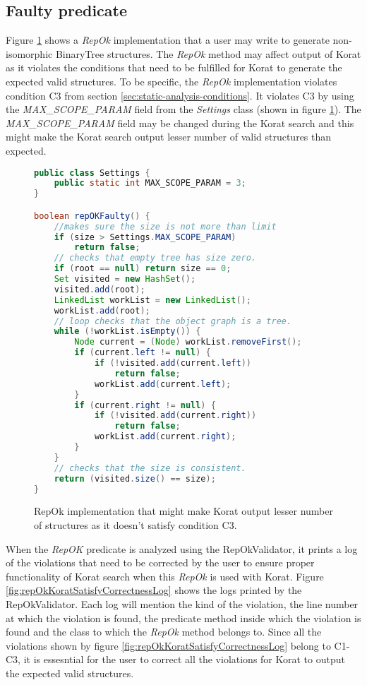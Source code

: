 \subsection{Faulty predicate}
\label{sec:faulty-predicate}
Figure \ref{fig:repOkKoratSatisfyCorrectness} shows a \emph{RepOk}
implementation that a user may write to generate non-isomorphic
BinaryTree structures. The \emph{RepOk} method may affect output of
Korat as it violates the conditions that need to be fulfilled for
Korat to generate the expected valid structures. To be specific, the
\emph{RepOk} implementation violates condition C3 from section
\ref{sec:static-analysis-conditions}. It violates C3 by using the
\emph{MAX\_SCOPE\_PARAM} field from the \emph{Settings} class (shown
in figure \ref{fig:repOkKoratSatisfyCorrectness}). The
\emph{MAX\_SCOPE\_PARAM} field may be changed during the Korat search
and this might make the Korat search output lesser number of valid
structures than expected.

\begin{figure}
\centering
\begin{lstlisting}[language=Java]
public class Settings {
    public static int MAX_SCOPE_PARAM = 3;
}

boolean repOKFaulty() {
    //makes sure the size is not more than limit
    if (size > Settings.MAX_SCOPE_PARAM) 
        return false;
    // checks that empty tree has size zero.
    if (root == null) return size == 0;
    Set visited = new HashSet();
    visited.add(root);
    LinkedList workList = new LinkedList();
    workList.add(root);
    // loop checks that the object graph is a tree.
    while (!workList.isEmpty()) {
        Node current = (Node) workList.removeFirst();
        if (current.left != null) {
            if (!visited.add(current.left))
                return false;
            workList.add(current.left);
        }
        if (current.right != null) {
            if (!visited.add(current.right))
                return false;
            workList.add(current.right);
        }
    }
    // checks that the size is consistent.
    return (visited.size() == size);
}

\end{lstlisting}
\caption{RepOk implementation that might make Korat output lesser number of structures as it doesn’t satisfy condition C3.}
\label{fig:repOkKoratSatisfyCorrectness}
\end{figure}

\para When the \emph{RepOK} predicate is analyzed using the
RepOkValidator, it prints a log of the violations that need to be
corrected by the user to ensure proper functionality of Korat search
when this \emph{RepOk} is used with Korat. Figure
\ref{fig:repOkKoratSatisfyCorrectnessLog} shows the logs printed by
the RepOkValidator. Each log will mention the kind of the violation,
the line number at which the violation is found, the predicate method
inside which the violation is found and the class to which the
\emph{RepOk} method belongs to. Since all the violations shown by
figure \ref{fig:repOkKoratSatisfyCorrectnessLog} belong to C1-C3, it
is essesntial for the user to correct all the violations for Korat to
output the expected valid structures.

